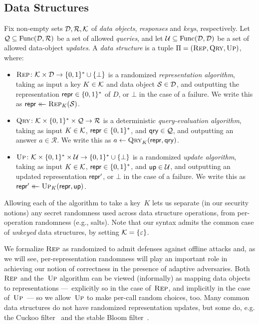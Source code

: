 \subsection{Data Structures}
Fix non-empty sets $\mathcal{D}, \mathcal{R}, \mathcal{K}$ of \emph{data objects},
\emph{responses} and \emph{keys}, respectively.  Let $\mathcal{Q}\subseteq
\mathrm{Func}(\mathcal{D},\mathcal{R})$ be a set of allowed \emph{queries}, and let
$\mathcal{U} \subseteq \mathrm{Func}(\mathcal{D},\mathcal{D})$ be a set of allowed
data-object \emph{updates}.  A {\em data structure} is a tuple $\Pi =
(\textnormal{\textsc{Rep}},\textnormal{\textsc{Qry}},\textnormal{\textsc{Up}})$, where:

\begin{itemize}
  \item $\textnormal{\textsc{Rep}}\colon \mathcal{K} \times \mathcal{D} \to \{0,1\}^* \cup \{\bot\}$ is a
  randomized {\em representation algorithm}, taking as input a key $K \in
  \mathcal{K}$ and data object $\mathcal{S} \in \mathcal{D}$, and outputting the
  representation $\mathsf{repr} \in \{0,1\}^*$ of $D$, or $\bot$ in the case of a
  failure. We write this as $\mathsf{repr} \mathrel{\leftarrow\mkern-14mu\leftarrow} \textnormal{\textsc{Rep}}_K(\mathcal{S})$.
%
  \item $\textnormal{\textsc{Qry}}\colon \mathcal{K} \times \{0,1\}^* \times \mathcal{Q} \to \mathcal{R}$
  is a deterministic {\em query-evaluation algorithm}, taking as input $K \in
  \mathcal{K}$, $\mathsf{repr} \in \{0,1\}^*$, and $\mathsf{qry} \in \mathcal{Q}$, and outputting an
  answer $a \in \mathcal{R}$. We write this as $a \gets \textnormal{\textsc{Qry}}_K(\mathsf{repr},\mathsf{qry})$.
%
  \item $\textnormal{\textsc{Up}}\colon \mathcal{K} \times \{0,1\}^* \times \mathcal{U} \to \{0,1\}^* \cup
  \{\bot\}$ is a randomized {\em update algorithm}, taking as input $K \in
  \mathcal{K}$, $\mathsf{repr} \in \{0,1\}^*$, and $\mathsf{up} \in \mathcal{U}$, and outputting an
  updated representation $\mathsf{repr}'$, or $\bot$ in the case of a failure. We write
  this as $\mathsf{repr}' \mathrel{\leftarrow\mkern-14mu\leftarrow} \textnormal{\textsc{Up}}_K(\mathsf{repr},\mathsf{up})$.
\end{itemize}

Allowing each of the algorithm to take a key~$K$ lets us separate (in our
security notions) any secret randomness used across data structure operations,
from per-operation randomness (e.g., salts).  Note that our syntax admits the
common case of \emph{unkeyed} data structures, by setting
$\mathcal{K}=\{\varepsilon\}$.

We formalize $\textnormal{\textsc{Rep}}$ as randomized to admit defenses against offline attacks and,
as we will see, per-representation randomness will play an important role in
achieving our notion of correctness in the presence of adaptive adversaries.
Both~$\textnormal{\textsc{Rep}}$ and the~$\textnormal{\textsc{Up}}$ algorithm can be viewed (informally) as mapping data
objects to representations ---~explicitly so in the case of~$\textnormal{\textsc{Rep}}$, and
implicitly in the case of~$\textnormal{\textsc{Up}}$~--- so we allow~$\textnormal{\textsc{Up}}$ to make per-call random
choices, too.  Many common data structures do not have randomized representation
updates, but some do, e.g. the Cuckoo filter~\cite{fan2014cuckoo} and the stable
Bloom filter~\cite{deng2006approximately}.

